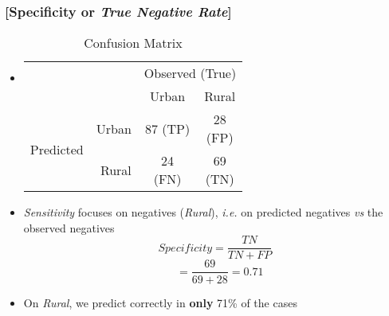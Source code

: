 \documentclass[xcolor=x11names,compress, handhouts]{beamer}
\renewcommand{\(}{\begin{columns}}
\renewcommand{\)}{\end{columns}}
\newcommand{\<}[1]{\begin{column}{#1}}
\renewcommand{\>}{\end{column}}
\begin{document}
\begin{frame} %
\frametitle{\textcolor{brique}{[Specificity or \textit{True Negative Rate}]}}
\begin{itemize}[<+->]
  \item[]
    \begin{table}[]
    \begin{tabular}{l r|c|c|}

                              & & \multicolumn{2}{c|}{Observed (True)}                                                                                          \\
                              & &    Urban  &  Rural  \\  \hline
    \multirow{2}{*}{Predicted}& Urban & \shortstack[c]{$87$ \\ \tiny{(TP)}}& \shortstack[c]{28 \\ \tiny{(FP)}} \\ \cline{2-4}
                              & Rural &  \shortstack[c]{24 \\ \tiny{(FN)}}& \shortstack[c]{69 \\ \tiny{(TN)}} \\ \hline
    \end{tabular}
    \caption{Confusion Matrix}
    \end{table}
  \item \textit{Sensitivity} focuses on  negatives (\textit{Rural}), \textit{i.e.} on predicted negatives \textit{vs} the observed negatives
   $$ Specificity = \frac{TN}{TN + FP} $$
   $$
 \; \; \;  =  \frac{69}{69+28} = 0.71
 $$
  \item On \textit{Rural}, we predict correctly in \textbf{only} 71\% of the cases
\end{itemize}
\end{frame}
\end{document}
